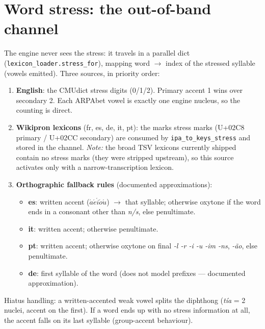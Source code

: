 \documentclass[11pt,a4paper]{article}
\begin{document}
\section{Word stress: the out-of-band channel}\label{sec:stress}

The engine never sees the stress: it travels in a parallel dict
(\texttt{lexicon\_loader.stress\_for}), mapping word $\rightarrow$
index of the stressed syllable (vowels emitted). Three sources, in
priority order:

\begin{enumerate}[itemsep=2pt]
\item \textbf{English}: the CMUdict stress digits (0/1/2). Primary
  accent 1 wins over secondary 2. Each ARPAbet vowel is exactly one
  engine nucleus, so the counting is direct.
\item \textbf{Wikipron lexicons} (fr, es, de, it, pt): the marks
  stress marks (U+02C8 primary / U+02CC secondary)
  are consumed by \texttt{ipa\_to\_keys\_stress} and stored in the
  channel. \emph{Note:} the broad TSV lexicons currently shipped
  contain no stress marks (they were stripped upstream), so this
  source activates only with a narrow-transcription lexicon.
\item \textbf{Orthographic fallback rules} (documented
  approximations):
  \begin{itemize}[itemsep=1pt]
  \item \textbf{es}: written accent ($\acute{a}\acute{e}\acute{i}
    \acute{o}\acute{u}$) $\rightarrow$ that syllable; otherwise
    oxytone if the word ends in a consonant other than \emph{n/s},
    else penultimate.
  \item \textbf{it}: written accent; otherwise penultimate.
  \item \textbf{pt}: written accent; otherwise oxytone on final
    \emph{-l -r -i -u -im -ns}, \emph{-\~ao}, else penultimate.
  \item \textbf{de}: first syllable of the word (does not model
    prefixes --- documented approximation).
  \end{itemize}
\end{enumerate}

Hiatus handling: a written-accented weak vowel splits the
diphthong (\emph{t\'ia} = 2 nuclei, accent on the first). If a word
ends up with no stress information at all, the accent falls on its
last syllable (group-accent behaviour).

\end{document}
